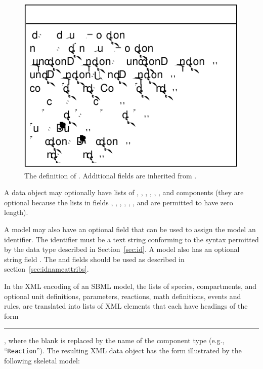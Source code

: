 \documentclass[10pt]{cekarticle}
\begin{document}
\begin{figure}[htb]
  \centering
  \includegraphics[scale = 0.68]{model}
  \caption{The definition of .  Additional fields are
    inherited from .}
  \label{fig:model}
\end{figure}

A  data
object may optionally have lists of , , ,
, , ,
 and  components (they are optional
because the lists in fields , , , , , ,  and  are permitted to have zero
length).

A model may also have an optional  field that can be
used to assign the model an identifier. The identifier must be a
text string conforming to the syntax permitted by the 
data type described in Section~\ref{sec:id}. A model also has an
optional string field .  The  and
 fields should be used as described in
section~\ref{sec:idnameattribs}.

In the XML encoding of an SBML model, the lists of species,
compartments, and optional unit definitions, parameters,
reactions, math definitions, events and rules, are translated into
lists of XML elements that each have headings of the form
\rule{0.5in}{0.5pt}, where the blank is
replaced by the name of the component type (e.g.,
``\texttt{Reaction}'').  The resulting XML data object has the
form illustrated by the following skeletal model:
\end{document}
